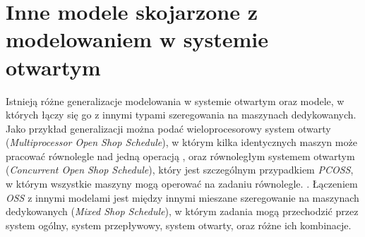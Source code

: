 \documentclass[brudnopis]{xmgr}
\begin{document}
\section{Inne modele skojarzone z modelowaniem w systemie otwartym}
Istnieją różne generalizacje modelowania w systemie otwartym oraz modele, w których łączy się go z innymi typami szeregowania na maszynach dedykowanych.
Jako przykład generalizacji można podać wieloprocesorowy system otwarty (\emph{Multiprocessor Open Shop Schedule}), w którym kilka identycznych maszyn może pracować równolegle nad jedną operacją \cite{adakmultiprocessor}, oraz równoległym systemem otwartym (\emph{Concurrent Open Shop Schedule}), który jest szczególnym przypadkiem \emph{PCOSS}, w którym wszystkie maszyny mogą operować na zadaniu równolegle. \cite{wagneur1993openshops}.
Łączeniem \emph{OSS} z innymi modelami jest między innymi mieszane szeregowanie na maszynach dedykowanych (\emph{Mixed Shop Schedule}), w którym zadania mogą przechodzić przez system ogólny, system przepływowy, system otwarty, oraz różne ich kombinacje.
\end{document}
